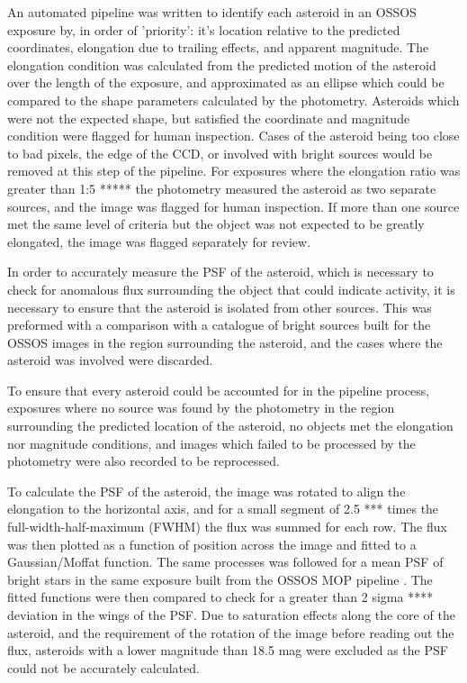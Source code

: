 \documentclass[iop,apj]{emulateapj}
\begin{document}
An automated pipeline was written to identify each asteroid in an OSSOS exposure by, in order of 'priority': it's location relative to the predicted coordinates,  elongation due to trailing effects, and apparent magnitude. The elongation condition was calculated from the predicted motion of the asteroid over the length of the exposure, and approximated as an ellipse which could be compared to the shape parameters calculated by the photometry. Asteroids which were not the expected shape, but satisfied the coordinate and magnitude condition were flagged for human inspection. Cases of the asteroid being too close to bad pixels, the edge of the CCD, or involved with bright sources would be removed at this step of the pipeline. For exposures where the elongation ratio was greater than 1:5 ***** the photometry measured the asteroid as two separate sources, and the image was flagged for human inspection. If more than one source met the same level of criteria but the object was not expected to be greatly elongated, the image was flagged separately for review.

In order to accurately measure the PSF of the asteroid, which is necessary to check for anomalous flux surrounding the object that could indicate activity, it is necessary to ensure that the asteroid is isolated from other sources. This was preformed with a comparison with a catalogue of bright sources built for the OSSOS images \citep{ossos} in the region surrounding the asteroid, and the cases where the asteroid was involved were discarded.

To ensure that every asteroid could be accounted for in the pipeline process, exposures where no source was found by the photometry in the region surrounding the predicted location of the asteroid, no objects met the elongation nor magnitude conditions, and images which failed to be processed by the photometry were also recorded to be reprocessed.


To calculate the PSF of the asteroid, the image was rotated to align the elongation to the horizontal axis, and for a small segment of 2.5 *** times the full-width-half-maximum (FWHM) the flux was summed for each row. The flux was then plotted as a function of position across the image and fitted to a Gaussian/Moffat function. The same processes was followed for a mean PSF of bright stars in the same exposure built from the OSSOS MOP pipeline \citep{ossos}. The fitted functions were then compared to check for a greater than 2 sigma **** deviation in the wings of the PSF. Due to saturation effects along the core of the asteroid, and the requirement of the rotation of the image before reading out the flux, asteroids with a lower magnitude than 18.5 mag were excluded as the PSF could not be accurately calculated. 
\end{document}
